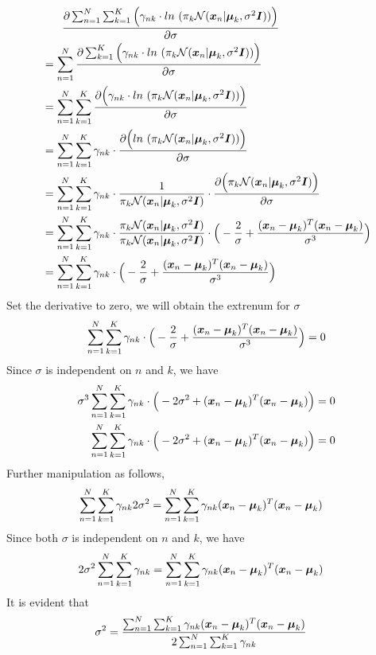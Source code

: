 \documentclass[11pt,a4paper]{article}
\newcommand{\htab}{\hspace*{0.63cm}}
\begin{document}
\begin{align}
    &\htab \frac {\partial \sumn  \sumk \Big( \gamma_{nk} \cdot ln\ ( \pk \Nxn) \Big)}
    {\partial \sigma}  \\
    &= \sumn \frac {\partial  \sumk \Big( \gamma_{nk} \cdot ln\ ( \pk \Nxn) \Big)}
    {\partial \sigma}  \\
    &= \sumn \sumk \frac {\partial  \Big( \gamma_{nk} \cdot ln\ ( \pk \Nxn) \Big)}
    {\partial \sigma}  \\
    &= \sumn \sumk \gamma_{nk} \cdot \frac {\partial  \Big(  ln\ ( \pk \Nxn) \Big)}
    {\partial \sigma}  \\
    &= \sumn \sumk \gamma_{nk} \cdot \frac{1}{\pk \Nxn} \cdot \frac {\partial  \Big(   \pk \Nxn \Big)}
    {\partial \sigma}  \\
    &= \sumn \sumk \gamma_{nk} \cdot \frac{\pk \Nxn}{\pk \Nxn} \cdot 
    \Big(- \frac {2}{\sigma} + \frac{(\difxm)^{T} (\difxm)}{\sigma^{3}} \Big)  \\
    &= \sumn \sumk \gamma_{nk} \cdot 
    \Big(- \frac {2}{\sigma} + \frac{(\difxm)^{T} (\difxm)}{\sigma^{3}} \Big) 
    \end{align}
\htab Set the derivative to zero, we will obtain the extrenum for $\sigma$
    \begin{align}
     \sum_{n=1}^{N} \sum_{k=1}^{K} \gamma_{nk} \cdot 
    \Big(- \frac {2}{\sigma} + \frac{(\boldsymbol{x}_{n} - \boldsymbol{\mu}_{k})^{T} (\boldsymbol{x}_{n} - \boldsymbol{\mu}_{k})}{\sigma^{3}} \Big) = 0 
    \end{align}
\htab Since $\sigma$ is independent on $n$ and $k$, we have
\begin{align}
    \sigma^{3} \sum_{n=1}^{N} \sum_{k=1}^{K} \gamma_{nk} \cdot 
    \Big(- 2\sigma^{2} + (\boldsymbol{x}_{n} - \boldsymbol{\mu}_{k})^{T} (\boldsymbol{x}_{n} - \boldsymbol{\mu}_{k}) \Big) &= 0 \\
     \sum_{n=1}^{N} \sum_{k=1}^{K} \gamma_{nk} \cdot 
    \Big(- 2\sigma^{2} + (\boldsymbol{x}_{n} - \boldsymbol{\mu}_{k})^{T} (\boldsymbol{x}_{n} - \boldsymbol{\mu}_{k}) \Big) &= 0  
     \end{align}
\htab Further manipulation as follows,
\begin{align}
     \sum_{n=1}^{N} \sum_{k=1}^{K} \gamma_{nk} 2\sigma^{2} &= \sum_{n=1}^{N} \sum_{k=1}^{K} \gamma_{nk} (\boldsymbol{x}_{n} - \boldsymbol{\mu}_{k})^{T} (\boldsymbol{x}_{n} - \boldsymbol{\mu}_{k})
    \end{align}
\htab Since both $\sigma$ is independent on $n$ and $k$, we have
\begin{align}
     2 \sigma^{2} \sum_{n=1}^{N} \sum_{k=1}^{K} \gamma_{nk}  &= \sum_{n=1}^{N} \sum_{k=1}^{K} \gamma_{nk} (\boldsymbol{x}_{n} - \boldsymbol{\mu}_{k})^{T} (\boldsymbol{x}_{n} - \boldsymbol{\mu}_{k})
    \end{align}
\htab It is evident that 
\begin{align}
    \sigma^{2}  
    &= \frac{\sum_{n=1}^{N} \sum_{k=1}^{K} \gamma_{nk} (\boldsymbol{x}_{n} - \boldsymbol{\mu}_{k})^{T} (\boldsymbol{x}_{n} - \boldsymbol{\mu}_{k})}
        {2 \sum_{n=1}^{N} \sum_{k=1}^{K} \gamma_{nk}}
    \end{align}
\end{document}
